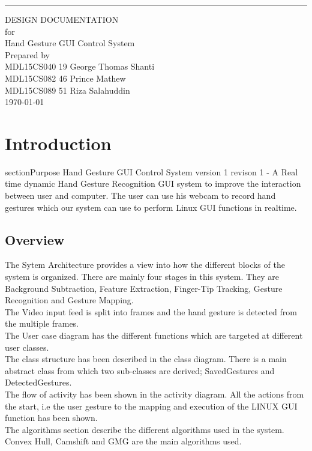 \documentclass{scrreprt}
\date{}
\begin{document}
\begin{flushright}
    \rule{16cm}{5pt}\vskip1cm
    \begin{bfseries}
        \Huge{DESIGN DOCUMENTATION}\\
        \vspace{1.9cm}
        for\\
        \vspace{1.9cm}
        Hand Gesture GUI Control System\\
        \vspace{1.9cm}
        \LARGE
        Prepared by \\MDL15CS040 19 George Thomas Shanti
        \\MDL15CS082 46 Prince Mathew
        \\MDL15CS089 51 Riza Salahuddin\\
        \vspace{1.9cm}
        \today\\
    \end{bfseries}
\end{flushright}

\tableofcontents


\chapter{Introduction}
section{Purpose}
Hand Gesture GUI Control System version 1 revison 1 - A Real time dynamic Hand Gesture Recognition GUI system to improve the interaction between user and computer. The user can use his webcam to record hand gestures which our system can use to perform Linux GUI functions in realtime.

\section{Overview}
  The Sytem Architecture provides a view into how the different blocks of the system is organized.
  There are mainly four stages in this system. They are Background Subtraction, Feature Extraction,
  Finger-Tip Tracking, Gesture Recognition and Gesture Mapping.\\
  The Video input feed is split into frames and the hand gesture is detected from the multiple frames.
  \\ The User case diagram has the different functions which are targeted at different user classes.
  \\The class structure has been described in the class diagram. There is a main abstract class from which two 
  sub-classes are derived; SavedGestures and DetectedGestures. \\
  The flow of activity has been shown in the activity diagram. All the actions from the start, i.e the user gesture to the mapping and execution of the LINUX GUI function has been shown.
  \\The algorithms section describe the different algorithms used in the system.
  Convex Hull, Camshift and GMG are the main algorithms used.
  
\end{document}
